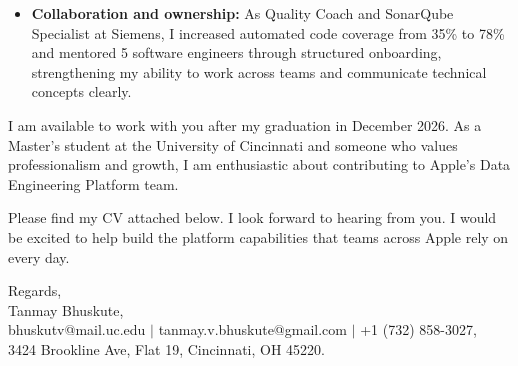 \documentclass[11pt]{letter}
\begin{document}
\begin{letter}{}
\begin{itemize}[leftmargin=*, itemsep=0.45em]
    \item \textbf{Collaboration and ownership:} As Quality Coach and SonarQube Specialist at Siemens, I increased automated code coverage from 35\% to 78\% and mentored 5 software engineers through structured onboarding, strengthening my ability to work across teams and communicate technical concepts clearly.
\end{itemize}

I am available to work with you after my graduation in December 2026. As a Master's student at the University of Cincinnati and someone who values professionalism and growth, I am enthusiastic about contributing to Apple's Data Engineering Platform team.

Please find my CV attached below. I look forward to hearing from you. I would be excited to help build the platform capabilities that teams across Apple rely on every day.

{\setlength{\parskip}{0pt}
Regards,\\
Tanmay Bhuskute,\\
bhuskutv@mail.uc.edu $\mid$ tanmay.v.bhuskute@gmail.com $\mid$ +1 (732) 858-3027,\\
3424 Brookline Ave, Flat 19, Cincinnati, OH 45220.
}

\end{letter}
\end{document}
